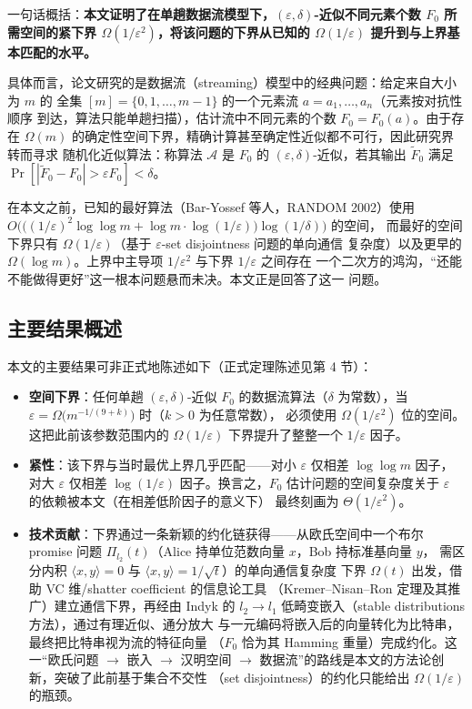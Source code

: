 \documentclass[UTF8, 11pt, a4paper, linestretch=1.15]{ctexart}
\theoremstyle{zhstyle}
\newcommand{\eps}{\varepsilon}
\newcommand{\Fzero}{F_0}
\newcommand{\inner}[2]{\langle #1, #2 \rangle}
\begin{document}
	一句话概括：\textbf{本文证明了在单趟数据流模型下，$(\eps, \delta)$-近似不同元素个数
		$\Fzero$ 所需空间的紧下界 $\Omega(1/\eps^2)$，将该问题的下界从已知的 $\Omega(1/\eps)$
		提升到与上界基本匹配的水平。}
	
	具体而言，论文研究的是数据流（streaming）模型中的经典问题：给定来自大小为 $m$ 的
	全集 $[m] = \{0, 1, \dots, m-1\}$ 的一个元素流 $a = a_1, \dots, a_n$（元素按对抗性顺序
	到达，算法只能单趟扫描），估计流中不同元素的个数 $\Fzero = \Fzero(a)$。由于存在
	$\Omega(m)$ 的确定性空间下界，精确计算甚至确定性近似都不可行，因此研究界转而寻求
	随机化近似算法：称算法 $\mathcal{A}$ 是 $\Fzero$ 的 $(\eps, \delta)$-近似，若其输出
	$\tilde{F}_0$ 满足 $\Pr[|\tilde{F}_0 - \Fzero| > \eps \Fzero] < \delta$。
	
	在本文之前，已知的最好算法（Bar-Yossef 等人，RANDOM 2002）使用
	$O\big(\big((1/\eps)^2 \log\log m + \log m \cdot \log(1/\eps)\big)\log(1/\delta)\big)$ 的空间，
	而最好的空间下界只有 $\Omega(1/\eps)$（基于 $\eps$-set disjointness 问题的单向通信
	复杂度）以及更早的 $\Omega(\log m)$。上界中主导项 $1/\eps^2$ 与下界 $1/\eps$ 之间存在
	一个二次方的鸿沟，“还能不能做得更好”这一根本问题悬而未决。本文正是回答了这一
	问题。
	
	\subsection{主要结果概述}
	
	本文的主要结果可非正式地陈述如下（正式定理陈述见第 4 节）：
	
	\begin{itemize}
		\item \textbf{空间下界}：任何单趟 $(\eps, \delta)$-近似 $\Fzero$ 的数据流算法（$\delta$
		为常数），当 $\eps = \Omega\big(m^{-1/(9+k)}\big)$ 时（$k > 0$ 为任意常数），
		必须使用 $\Omega(1/\eps^2)$ 位的空间。这把此前该参数范围内的
		$\Omega(1/\eps)$ 下界提升了整整一个 $1/\eps$ 因子。
		\item \textbf{紧性}：该下界与当时最优上界几乎匹配——对小 $\eps$ 仅相差
		$\log\log m$ 因子，对大 $\eps$ 仅相差 $\log(1/\eps)$ 因子。换言之，$\Fzero$
		估计问题的空间复杂度关于 $\eps$ 的依赖被本文（在相差低阶因子的意义下）
		最终刻画为 $\Theta(1/\eps^2)$。
		\item \textbf{技术贡献}：下界通过一条新颖的约化链获得——从欧氏空间中一个布尔
		promise 问题 $\Pi_{l_2}(t)$（Alice 持单位范数向量 $x$，Bob 持标准基向量 $y$，
		需区分内积 $\inner{x}{y} = 0$ 与 $\inner{x}{y} = 1/\sqrt{t}$）的单向通信复杂度
		下界 $\Omega(t)$ 出发，借助 VC 维/shatter coefficient 的信息论工具
		（Kremer--Nisan--Ron 定理及其推广）建立通信下界，再经由 Indyk 的
		$l_2 \to l_1$ 低畸变嵌入（stable distributions 方法），通过有理近似、通分放大
		与一元编码将嵌入后的向量转化为比特串，最终把比特串视为流的特征向量
		（$\Fzero$ 恰为其 Hamming 重量）完成约化。这一“欧氏问题 $\to$ 嵌入 $\to$
		汉明空间 $\to$ 数据流”的路线是本文的方法论创新，突破了此前基于集合不交性
		（set disjointness）的约化只能给出 $\Omega(1/\eps)$ 的瓶颈。
	\end{itemize}
	
\end{document}
